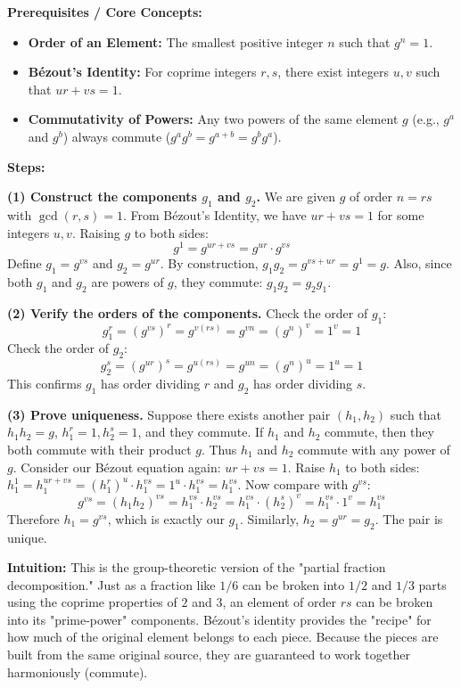 \begin{solution}
\textbf{Prerequisites / Core Concepts:}
\begin{itemize}
    \item \textbf{Order of an Element:} The smallest positive integer $n$ such that $g^n = 1$.
    \item \textbf{Bézout's Identity:} For coprime integers $r, s$, there exist integers $u, v$ such that $ur + vs = 1$.
    \item \textbf{Commutativity of Powers:} Any two powers of the same element $g$ (e.g., $g^a$ and $g^b$) always commute ($g^a g^b = g^{a+b} = g^b g^a$).
\end{itemize}

\textbf{Steps:}

\textbf{(1) Construct the components $g_1$ and $g_2$.}
We are given $g$ of order $n = rs$ with $\gcd(r, s) = 1$.
From Bézout's Identity, we have $ur + vs = 1$ for some integers $u, v$.
Raising $g$ to both sides:
\[ g^1 = g^{ur + vs} = g^{ur} \cdot g^{vs} \]
Define $g_1 = g^{vs}$ and $g_2 = g^{ur}$.
By construction, $g_1 g_2 = g^{vs+ur} = g^1 = g$.
Also, since both $g_1$ and $g_2$ are powers of $g$, they commute: $g_1 g_2 = g_2 g_1$.

\textbf{(2) Verify the orders of the components.}
Check the order of $g_1$:
\[ g_1^r = (g^{vs})^r = g^{v(rs)} = g^{vn} = (g^n)^v = 1^v = 1 \]
Check the order of $g_2$:
\[ g_2^s = (g^{ur})^s = g^{u(rs)} = g^{un} = (g^n)^u = 1^u = 1 \]
This confirms $g_1$ has order dividing $r$ and $g_2$ has order dividing $s$.

\textbf{(3) Prove uniqueness.}
Suppose there exists another pair $(h_1, h_2)$ such that $h_1 h_2 = g$, $h_1^r = 1, h_2^s = 1$, and they commute.
If $h_1$ and $h_2$ commute, then they both commute with their product $g$.
Thus $h_1$ and $h_2$ commute with any power of $g$.
Consider our Bézout equation again: $ur + vs = 1$.
Raise $h_1$ to both sides: $h_1^1 = h_1^{ur+vs} = (h_1^r)^u \cdot h_1^{vs} = 1^u \cdot h_1^{vs} = h_1^{vs}$.
Now compare with $g^{vs}$:
\[ g^{vs} = (h_1 h_2)^{vs} = h_1^{vs} \cdot h_2^{vs} = h_1^{vs} \cdot (h_2^s)^v = h_1^{vs} \cdot 1^v = h_1^{vs} \]
Therefore $h_1 = g^{vs}$, which is exactly our $g_1$. Similarly, $h_2 = g^{ur} = g_2$.
The pair is unique.

\textbf{Intuition:}
This is the group-theoretic version of the "partial fraction decomposition." Just as a fraction like $1/6$ can be broken into $1/2$ and $1/3$ parts using the coprime properties of $2$ and $3$, an element of order $rs$ can be broken into its "prime-power" components. Bézout's identity provides the "recipe" for how much of the original element belongs to each piece. Because the pieces are built from the same original source, they are guaranteed to work together harmoniously (commute).
\end{solution}

